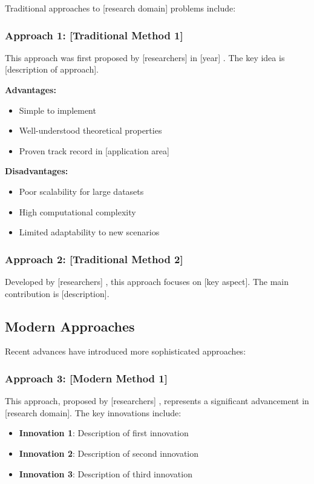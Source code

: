 Traditional approaches to [research domain] problems include:

\subsubsection{Approach 1: [Traditional Method 1]}
This approach was first proposed by [researchers] in [year] \cite{example-reference-1}. The key idea is [description of approach]. 

\textbf{Advantages:}
\begin{itemize}
    \item Simple to implement
    \item Well-understood theoretical properties
    \item Proven track record in [application area]
\end{itemize}

\textbf{Disadvantages:}
\begin{itemize}
    \item Poor scalability for large datasets
    \item High computational complexity
    \item Limited adaptability to new scenarios
\end{itemize}

\subsubsection{Approach 2: [Traditional Method 2]}
Developed by [researchers] \cite{example-reference-2}, this approach focuses on [key aspect]. The main contribution is [description].

\subsection{Modern Approaches}

Recent advances have introduced more sophisticated approaches:

\subsubsection{Approach 3: [Modern Method 1]}
This approach, proposed by [researchers] \cite{example-reference-3}, represents a significant advancement in [research domain]. The key innovations include:
\begin{itemize}
    \item \textbf{Innovation 1}: Description of first innovation
    \item \textbf{Innovation 2}: Description of second innovation
    \item \textbf{Innovation 3}: Description of third innovation
\end{itemize}

